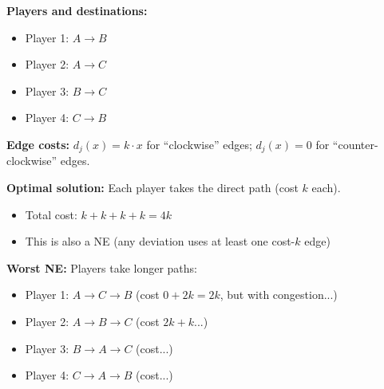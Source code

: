 \begin{exbox}[Tight PoA = 2.5 Example (4 Players)]
\begin{center}
\end{center}

\textbf{Players and destinations:}
\begin{itemize}
  \item Player 1: $A \to B$
  \item Player 2: $A \to C$
  \item Player 3: $B \to C$
  \item Player 4: $C \to B$
\end{itemize}

\textbf{Edge costs:} $d_j(x) = k \cdot x$ for ``clockwise'' edges; $d_j(x) = 0$ for ``counter-clockwise'' edges.

\textbf{Optimal solution:} Each player takes the direct path (cost $k$ each).
\begin{itemize}
  \item Total cost: $k + k + k + k = 4k$
  \item This is also a NE (any deviation uses at least one cost-$k$ edge)
\end{itemize}

\textbf{Worst NE:} Players take longer paths:
\begin{itemize}
  \item Player 1: $A \to C \to B$ (cost $0 + 2k = 2k$, but with congestion...)
  \item Player 2: $A \to B \to C$ (cost $2k + k$...)
  \item Player 3: $B \to A \to C$ (cost...)
  \item Player 4: $C \to A \to B$ (cost...)
\end{itemize}


\end{exbox}
